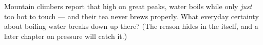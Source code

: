 \begin{exercise}[$\star\star$]\label{exo:g4:changes-of-state:11}
Mountain climbers report that high on great peaks, water boils
while only \emph{just} too hot to touch --- and their tea never
brews properly. What everyday certainty about boiling water breaks
down up there? (The reason hides in the  itself, and a later
chapter on  pressure will catch it.)
\end{exercise}
